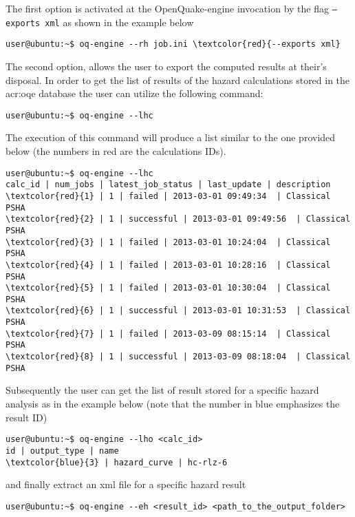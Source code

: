 The first option is activated at the OpenQuake-engine invocation by 
the flag \texttt{--exports xml} as shown in the example below
\begin{Verbatim}[frame=single, commandchars=\\\{\}, fontsize=\small]
user@ubuntu:~$ oq-engine --rh job.ini \textcolor{red}{--exports xml}
\end{Verbatim}

The second option, allows the user to export the computed results at 
their's disposal.
In order to get the list of results of the hazard calculations stored 
in the \gls{acr:oqe} database the user can utilize the following command:
\begin{Verbatim}[frame=single, commandchars=\\\{\}, fontsize=\small]
user@ubuntu:~$ oq-engine --lhc
\end{Verbatim}
The execution of this command will produce a list similar to the 
one provided below (the numbers in red are the calculations IDs).
\begin{Verbatim}[frame=single, commandchars=\\\{\}, fontsize=\small]
user@ubuntu:~$ oq-engine --lhc
calc_id | num_jobs | latest_job_status | last_update | description
\textcolor{red}{1} | 1 | failed | 2013-03-01 09:49:34  | Classical PSHA
\textcolor{red}{2} | 1 | successful | 2013-03-01 09:49:56  | Classical PSHA
\textcolor{red}{3} | 1 | failed | 2013-03-01 10:24:04  | Classical PSHA
\textcolor{red}{4} | 1 | failed | 2013-03-01 10:28:16  | Classical PSHA
\textcolor{red}{5} | 1 | failed | 2013-03-01 10:30:04  | Classical PSHA
\textcolor{red}{6} | 1 | successful | 2013-03-01 10:31:53  | Classical PSHA
\textcolor{red}{7} | 1 | failed | 2013-03-09 08:15:14  | Classical PSHA
\textcolor{red}{8} | 1 | successful | 2013-03-09 08:18:04  | Classical PSHA
\end{Verbatim}
Subsequently the user can get the list of result stored for a specific 
hazard analysis as in the example below (note that the number in blue 
emphasizes the result ID)
\begin{Verbatim}[frame=single, commandchars=\\\{\}, fontsize=\small]
user@ubuntu:~$ oq-engine --lho <calc_id>
id | output_type | name
\textcolor{blue}{3} | hazard_curve | hc-rlz-6
\end{Verbatim}
and finally extract an xml file for a specific hazard result 
\begin{Verbatim}[frame=single, commandchars=\\\{\}, fontsize=\small]
user@ubuntu:~$ oq-engine --eh <result_id> <path_to_the_output_folder>
\end{Verbatim}


